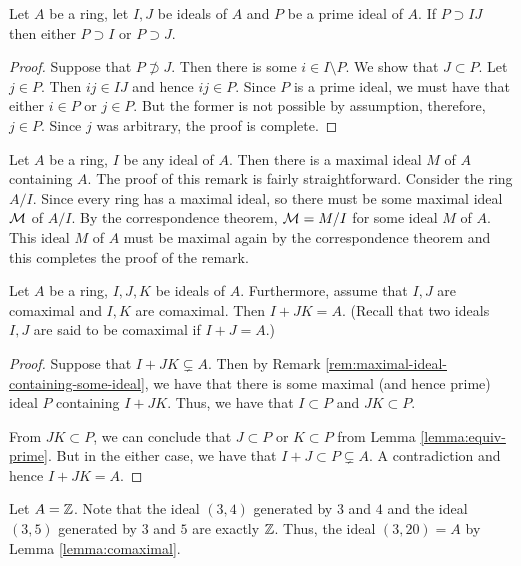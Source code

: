 
\begin{lemma}
    Let $A$ be a ring, let $I,J $ be ideals of $A$ and $P$ be a prime ideal of $A$. If $P \supset IJ$ then either $P \supset I$ or $P\supset J$.
    \label{lemma:equiv-prime}
\end{lemma}
\begin{proof}
    Suppose that $P \not \supset J$. Then there is some $i\in I \setminus P$. We show that $J \subset P$. Let $j \in P$. Then $ij \in IJ$ and hence $ij \in P$. Since $P$ is a prime ideal, we must have that either $i\in P $ or $j \in P$. But the former is not possible by assumption, therefore, $j\in P$. Since $j$ was arbitrary, the proof is complete.
\end{proof}

\begin{remark}
    Let $A$ be a ring, $I$ be any ideal of $A$. Then there is a maximal ideal $M$ of $A$ containing $A$. The proof of this remark is fairly straightforward. Consider the ring $A/I$. Since every ring has a maximal ideal, so there must be some maximal ideal ${\cal M}$ of $A/I$. By the correspondence theorem, ${\cal M} = M/I$ for some ideal $M$ of $A$. This ideal $M$ of $A$ must be maximal again by the correspondence theorem and this completes the proof of the remark.
    \label{rem:maximal-ideal-containing-some-ideal}
\end{remark}

\begin{lemma}
    Let $A$ be a ring, $I, J, K$ be ideals of $A$. Furthermore, assume that $I, J$ are comaximal and $I, K$ are comaximal. Then $I+JK=A$. (Recall that two ideals $I,J$ are said to be comaximal if $I+J=A$.)
    \label{lemma:comaximal}
\end{lemma}
\begin{proof}
    Suppose that $I+JK \subsetneq A$. Then by Remark \ref{rem:maximal-ideal-containing-some-ideal}, we have that there is some maximal (and hence prime) ideal $P$ containing $I+JK$. Thus, we have that $I\subset P$ and $JK \subset P$. 

    From $JK \subset P$, we can conclude that $J\subset P$ or $K \subset P$ from Lemma \ref{lemma:equiv-prime}. But in the either case, we have that $I+J \subset P \subsetneq A$. A contradiction and hence $I+JK = A$.
\end{proof}

\begin{example}
    Let $A=\mathbb Z$. Note that the ideal $\left( 3,4 \right)$ generated by $3$ and $4$ and the ideal $\left( 3,5 \right)$ generated by $3$ and $5$ are exactly $\mathbb Z$. Thus, the ideal $\left( 3, 20 \right) =A$ by Lemma \ref{lemma:comaximal}.
\end{example}


